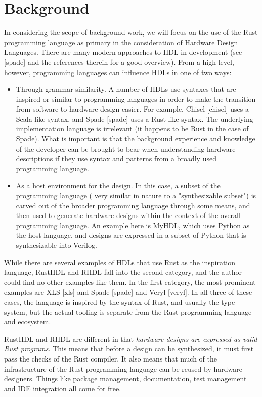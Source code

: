 \documentclass[conference]{IEEEtran}
\begin{document}
\section{Background}

In considering the scope of background work, we will focus on the use of the Rust programming
language as primary in the consideration of Hardware Design Languages.  There are many modern
approaches to HDL in development (see [spade] and the references therein for a good overview).  
From a high level, however, programming languages can influence HDLs in one of two ways:

\begin{itemize}
  \item Through grammar similarity.  A number of HDLs use syntaxes that are inspired or similar to
  programming languages in order to make the transition from software to hardware design easier.
  For example, Chisel [chisel] uses a Scala-like syntax, and Spade [spade] uses a Rust-like syntax.
  The underlying implementation language is irrelevant (it happens to be Rust in the case of Spade).
  What is important is that the background experience and knowledge of the developer can be brought 
  to bear when understanding hardware descriptions if they use syntax and patterns from a broadly
  used programming language.
  \item As a host environment for the design.  In this case, a subset of the programming language (
    very similar in nature to a "synthesizable subset") is carved out of the broader programming language
    through some means, and then used to generate hardware designs within the context of the overall
    programming language.  An example here is MyHDL, which uses Python as the host language, and 
    designs are expressed in a subset of Python that is synthesizable into Verilog.
\end{itemize}

While there are several examples of HDLs that use Rust as the inspiration language, RustHDL and
RHDL fall into the second category, and the author could find no other examples like them.  In the 
first category, the most prominent examples are XLS [xls] and Spade [spade] and Veryl [veryl].  
In all three of these cases, the language is inspired by the syntax of Rust, and usually the type
system, but the actual tooling is separate from the Rust programming language and ecosystem.

RustHDL and RHDL are different in that \emph{hardware designs are expressed as valid Rust programs}.
This means that before a design can be synthesized, it must first pass the checks of the Rust
compiler.   It also means that much of the infrastructure of the Rust programming language can be reused
by hardware designers.  Things like package management, documentation, test management and IDE 
integration all come for free.
\end{document}
